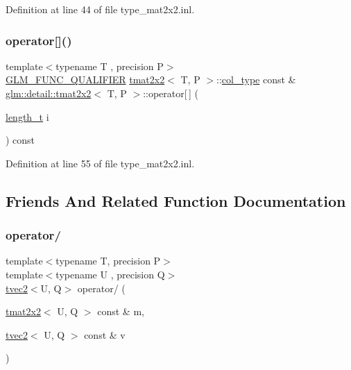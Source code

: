 Definition at line 44 of file type\+\_\+mat2x2.\+inl.

\mbox{\label{structglm_1_1detail_1_1tmat2x2_a3a9f2dd9b3a591b9aaad08aee8071c70}} 
\subsubsection{\texorpdfstring{operator[]()}{operator[]()}\hspace{0.1cm}{\footnotesize\ttfamily [2/2]}}
{\footnotesize\ttfamily template$<$typename T , precision P$>$ \\
\hyperlink{setup_8hpp_a33fdea6f91c5f834105f7415e2a64407}{G\+L\+M\+\_\+\+F\+U\+N\+C\+\_\+\+Q\+U\+A\+L\+I\+F\+I\+ER} \hyperlink{structglm_1_1detail_1_1tmat2x2}{tmat2x2}$<$ T, P $>$\+::\hyperlink{structglm_1_1detail_1_1tmat2x2_ae8c6de6197aa1b65adf15c40197c04d1}{col\+\_\+type} const  \& \hyperlink{structglm_1_1detail_1_1tmat2x2}{glm\+::detail\+::tmat2x2}$<$ T, P $>$\+::operator\mbox{[}$\,$\mbox{]} (\begin{DoxyParamCaption}\item[{\hyperlink{namespaceglm_a090a0de2260835bee80e71a702492ed9}{length\+\_\+t}}]{i }\end{DoxyParamCaption}) const}



Definition at line 55 of file type\+\_\+mat2x2.\+inl.



\subsection{Friends And Related Function Documentation}
\mbox{\label{structglm_1_1detail_1_1tmat2x2_a6d8b6618f8e231cea3dec1d6b21d7de3}} 
\subsubsection{\texorpdfstring{operator/}{operator/}\hspace{0.1cm}{\footnotesize\ttfamily [1/2]}}
{\footnotesize\ttfamily template$<$typename T, precision P$>$ \\
template$<$typename U , precision Q$>$ \\
\hyperlink{structglm_1_1detail_1_1tvec2}{tvec2}$<$U, Q$>$ operator/ (\begin{DoxyParamCaption}\item[{\hyperlink{structglm_1_1detail_1_1tmat2x2}{tmat2x2}$<$ U, Q $>$ const \&}]{m,  }\item[{\hyperlink{structglm_1_1detail_1_1tvec2}{tvec2}$<$ U, Q $>$ const \&}]{v }\end{DoxyParamCaption})\hspace{0.3cm}{\ttfamily [friend]}}

